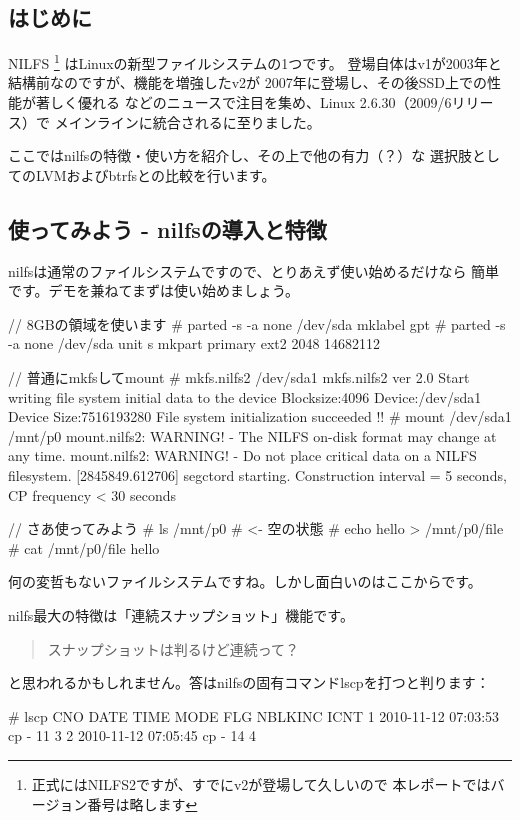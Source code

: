 \documentclass[mingoth,a4paper]{jsarticle}
\begin{document}
\subsection{はじめに}
NILFS
\footnote{正式にはNILFS2ですが、すでにv2が登場して久しいので
本レポートではバージョン番号は略します}
はLinuxの新型ファイルシステムの1つです。
登場自体はv1が2003年と結構前なのですが、機能を増強したv2が
2007年に登場し、その後SSD上での性能が著しく優れる\cite{nilbench}
などのニュースで注目を集め、Linux 2.6.30（2009/6リリース）で
メインラインに統合されるに至りました。

ここではnilfsの特徴・使い方を紹介し、その上で他の有力（？）な
選択肢としてのLVMおよびbtrfsとの比較を行います。

\subsection{使ってみよう - nilfsの導入と特徴}
\label{sec:try-nilfs}
nilfsは通常のファイルシステムですので、とりあえず使い始めるだけなら
簡単です。デモを兼ねてまずは使い始めましょう。

\begin{commandline}
// 8GBの領域を使います
# parted -s -a none /dev/sda mklabel gpt
# parted -s -a none /dev/sda unit s mkpart primary ext2 2048 14682112

// 普通にmkfsしてmount
# mkfs.nilfs2 /dev/sda1
mkfs.nilfs2 ver 2.0
Start writing file system initial data to the device
       Blocksize:4096  Device:/dev/sda1  Device Size:7516193280
File system initialization succeeded !!
# mount /dev/sda1 /mnt/p0
mount.nilfs2: WARNING! - The NILFS on-disk format may change at any time.
mount.nilfs2: WARNING! - Do not place critical data on a NILFS filesystem.
[2845849.612706] segctord starting. Construction interval = 5 seconds, CP frequency < 30 seconds

// さあ使ってみよう
# ls /mnt/p0
# <- 空の状態
# echo hello > /mnt/p0/file
# cat /mnt/p0/file
hello
\end{commandline}

何の変哲もないファイルシステムですね。しかし面白いのはここからです。

nilfs最大の特徴は「連続スナップショット」機能です。
\begin{quote}
\Large{スナップショットは判るけど連続って？}
\end{quote}
と思われるかもしれません。答はnilfsの固有コマンドlscpを打つと判ります：

\begin{commandline}
# lscp
CNO        DATE     TIME  MODE  FLG   NBLKINC       ICNT
  1  2010-11-12 07:03:53   cp    -         11          3
  2  2010-11-12 07:05:45   cp    -         14          4
\end{commandline}
\end{document}

